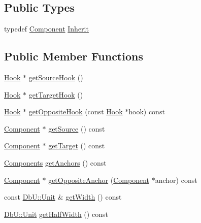 \subsection*{Public Types}
\begin{DoxyCompactItemize}
\item 
typedef \hyperlink{classHurricane_1_1Component}{Component} \hyperlink{classHurricane_1_1Segment_a2f616ba119bb6e9751659814bdbf0320}{Inherit}
\end{DoxyCompactItemize}
\subsection*{Public Member Functions}
\begin{DoxyCompactItemize}
\item 
\hyperlink{classHurricane_1_1Hook}{Hook} $\ast$ \hyperlink{classHurricane_1_1Segment_aa9d0303b444b44d7b8e47d42ac7151eb}{get\-Source\-Hook} ()
\item 
\hyperlink{classHurricane_1_1Hook}{Hook} $\ast$ \hyperlink{classHurricane_1_1Segment_a0fe6cd20516eca2a0b5639ab886bd831}{get\-Target\-Hook} ()
\item 
\hyperlink{classHurricane_1_1Hook}{Hook} $\ast$ \hyperlink{classHurricane_1_1Segment_a0aeeb0e81a742d18cf0efc02ef7fdfb5}{get\-Opposite\-Hook} (const \hyperlink{classHurricane_1_1Hook}{Hook} $\ast$hook) const 
\item 
\hyperlink{classHurricane_1_1Component}{Component} $\ast$ \hyperlink{classHurricane_1_1Segment_a896f044b16daa2b24acacbe58d166dd8}{get\-Source} () const 
\item 
\hyperlink{classHurricane_1_1Component}{Component} $\ast$ \hyperlink{classHurricane_1_1Segment_a801c10f665297312d54ec756dd6b0013}{get\-Target} () const 
\item 
\hyperlink{namespaceHurricane_a7d26d99aeb5dd6d70d51bd35d2473e72}{Components} \hyperlink{classHurricane_1_1Segment_a8236745ebce2a71948f27e42fd6ddcb1}{get\-Anchors} () const 
\item 
\hyperlink{classHurricane_1_1Component}{Component} $\ast$ \hyperlink{classHurricane_1_1Segment_a41448cbe3f09da3ee0ff03c74ccc13e2}{get\-Opposite\-Anchor} (\hyperlink{classHurricane_1_1Component}{Component} $\ast$anchor) const 
\item 
const \hyperlink{group__DbUGroup_ga4fbfa3e8c89347af76c9628ea06c4146}{Db\-U\-::\-Unit} \& \hyperlink{classHurricane_1_1Segment_adb01934c4aa6faf6c18adee52fc27e16}{get\-Width} () const 
\item 
\hyperlink{group__DbUGroup_ga4fbfa3e8c89347af76c9628ea06c4146}{Db\-U\-::\-Unit} \hyperlink{classHurricane_1_1Segment_aa2f1e9ed0dd459f2735e1b539acabd13}{get\-Half\-Width} () const 

\end{DoxyCompactItemize}
